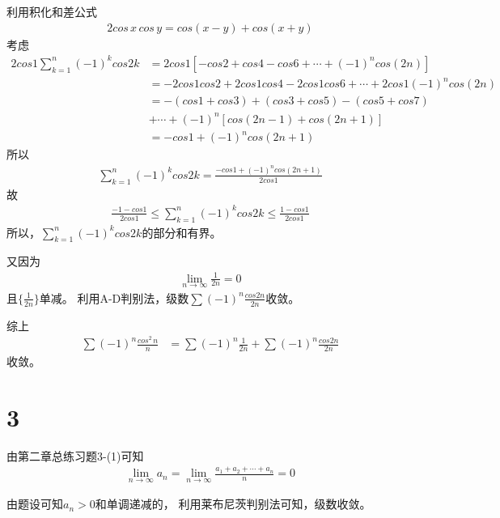 \documentclass{article}
\begin{document}
\begin{itemize}
        利用积化和差公式
        \begin{align*}
          2cos\, x \, cos\, y = cos (x - y) + cos (x + y)
        \end{align*}
        考虑
        \begin{align*}
          2 cos 1 \sum\limits_{k=1}^n (-1)^k cos 2k
           & = 2 cos 1 [-cos 2 + cos 4 - cos 6 + \cdots + (-1)^n cos (2n) ]                      \\
           & = - 2 cos 1 cos 2 + 2 cos 1 cos 4 - 2 cos 1 cos 6 + \cdots + 2cos 1 (-1)^n cos (2n) \\
           & = -(cos 1 + cos 3) + (cos 3 + cos 5) - (cos 5 + cos 7)                              \\
           & + \cdots + (-1)^n [cos (2n - 1) + cos (2n + 1)]                                     \\
           & = - cos 1 + (-1)^n cos (2n + 1)
        \end{align*}
        所以
        \begin{align*}
          \sum\limits_{k=1}^n (-1)^k cos 2k = \frac{- cos 1 + (-1)^n cos (2n + 1)}{2 cos 1}
        \end{align*}
        故
        \begin{align*}
          \frac{-1 - cos 1}{2 cos 1} \leq \sum\limits_{k=1}^n (-1)^k cos 2k \leq \frac{1 - cos 1}{2 cos 1}
        \end{align*}
        所以，$\sum\limits_{k=1}^n (-1)^k cos 2k$的部分和有界。

        又因为
        \begin{align*}
          \lim\limits_{n \to \infty} \frac{1}{2n} = 0
        \end{align*}
        且$\{\frac{1}{2n}\}$单减。
        利用A-D判别法，级数$\sum (-1)^n \frac{cos 2n}{2n}$收敛。

        综上
        \begin{align*}
          \sum (-1)^n \frac{cos^2\, n}{n} & = \sum (-1)^n \frac{1}{2n} + \sum (-1)^n \frac{cos 2n}{2n}
        \end{align*}
        收敛。
\end{itemize}

\section*{3}

由第二章总练习题3-(1)可知
\begin{align*}
  \lim\limits_{n \to \infty} a_n = \lim\limits_{n \to \infty} \frac{a_1 + a_2 + \cdots + a_n}{n} = 0
\end{align*}

由题设可知$a_n > 0$和单调递减的，
利用莱布尼茨判别法可知，级数收敛。
\end{document}
